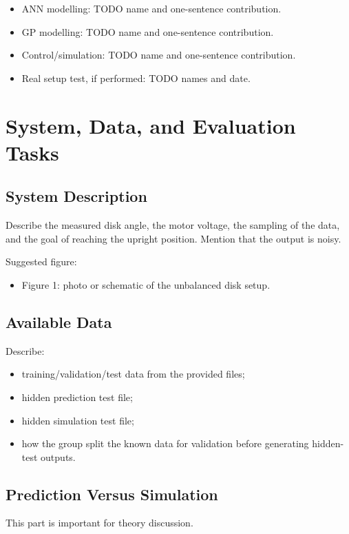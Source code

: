\documentclass[conference]{IEEEtran}
\begin{document}
\begin{itemize}
    \item ANN modelling: TODO name and one-sentence contribution.
    \item GP modelling: TODO name and one-sentence contribution.
    \item Control/simulation: TODO name and one-sentence contribution.
    \item Real setup test, if performed: TODO names and date.
\end{itemize}

\section{System, Data, and Evaluation Tasks}

\subsection{System Description}
Describe the measured disk angle, the motor voltage, the sampling of the data, and the goal of reaching the upright position.
Mention that the output is noisy.

Suggested figure:
\begin{itemize}
    \item Figure 1: photo or schematic of the unbalanced disk setup.
\end{itemize}

\subsection{Available Data}
Describe:
\begin{itemize}
    \item training/validation/test data from the provided files;
    \item hidden prediction test file;
    \item hidden simulation test file;
    \item how the group split the known data for validation before generating hidden-test outputs.
\end{itemize}

\subsection{Prediction Versus Simulation}
This part is important for theory discussion.
\end{document}
